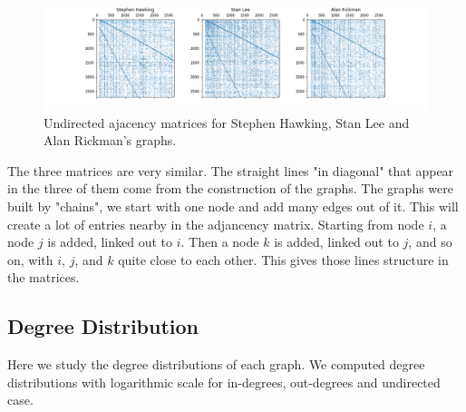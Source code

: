 \documentclass[conference]{IEEEtran}
\begin{document}
\begin{figure}[!htb]
  \includegraphics[width=\linewidth]{matrices.png}
\caption{Undirected ajacency matrices for Stephen Hawking, Stan Lee and Alan Rickman's graphs. }
\end{figure}

The three matrices are very similar. The straight lines "in diagonal" that appear in the three of them come from the construction of the graphs. The graphs were built by "chains", we start with one node and add many edges out of it. This will create a lot of entries nearby in the adjancency matrix. Starting from node $i$, a node $j$ is added, linked out to $i$. Then a node $k$ is added, linked out to $j$, and so on, with $i$, $j$, and $k$ quite close to each other. This gives those lines structure in the matrices. 

\subsection{Degree Distribution}

Here we study the degree distributions of each graph. We computed degree distributions with logarithmic scale for in-degrees, out-degrees and undirected case. 
\end{document}

